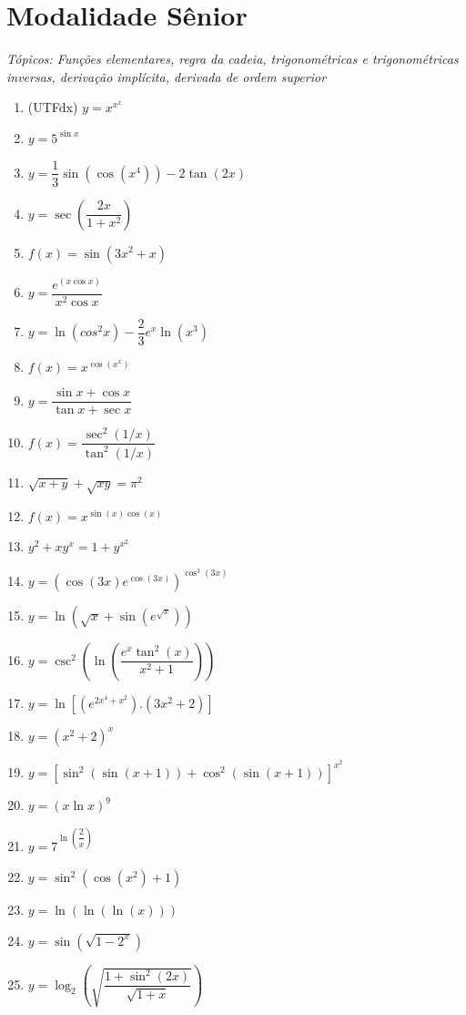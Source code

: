 \documentclass[12pt]{article}
\begin{document}
		
	\section*{Modalidade Sênior} 
		\textit{\justifying Tópicos: Funções elementares, regra da cadeia, trigonométricas e trigonométricas inversas, derivação implícita, derivada de ordem superior}
		\begin{enumerate}
			\item (UTFdx) $y=x^{x^{x}}$
			\item $y=5^{\sin x}$
			\item $y=\dfrac{1}{3}\sin(\cos(x^{4}))-2\tan(2x)$ 
			\item $y=\sec\left(\dfrac{2x}{1+x^{2}} \right)$
			\item $f(x)=\sin (3x^{2}+x)$ %
			\item $y=\dfrac{e^{\left(x \cos x \right) }}{x^{2}\cos x}$
			\item $y=\ln(cos^{2}x)-\dfrac{2}{3}e^{x}\ln(x^{3})$
			\item $f(x)=x^{\cos(x^{x})}$
			\item $y=\dfrac{\sin x + \cos x}{\tan x + \sec x}$
			\item $f(x)=\dfrac{\sec^{2}({1}/{x})}{\tan^{2}({1}/{x})}$
			\item $\sqrt{x+y}+\sqrt{xy}=\pi^{2}$
			\item $f(x)=x^{\sin(x)\cos(x)}$
			\item $y^{2}+xy^{x}=1+y^{x^{2}}$
			\item $y=\left( \cos (3x) e^{\cos (3x)} \right)^{\cos^{3}(3x)}$
			\item $y=\ln \left( \sqrt{x}+\sin (e^{\sqrt{x}}) \right)$
			\item $y=\csc^{2}\left( \ln \left( \dfrac{e^{x}\tan^{2}(x)}{x^{2}+1} \right) \right)$
			\item $y=\ln \left[ (e^{2x^{4}+x^{2}}).(3x^{2}+2) \right]$
			\item $y=(x^{2}+2)^{x}$
			\item $y=\left[ \sin^{2}(\sin(x+1))+\cos^{2}(\sin(x+1)) \right]^{x^{2}}$
			\item $y=(x \ln x)^{9}$
			\item $y=7^{\ln \left( \dfrac{2}{x} \right) }$
			\item $y=\sin^{2}(\cos(x^{2})+1)$
			\item $y=\ln (\ln (\ln (x)))$
			\item $y=\sin (\sqrt{1-2^{x}})$
			\item $y=\log_{2}\left( \sqrt{\dfrac{1+\sin^{2}(2x)}{\sqrt{1+x}}} \right) $

\end{enumerate}
\end{document}
